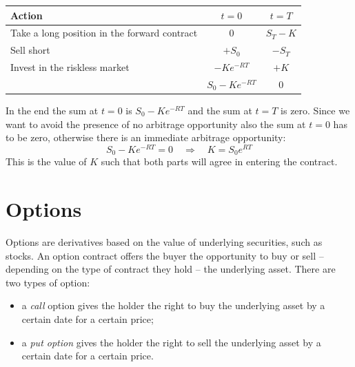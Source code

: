 \begin{center}
    \begin{tabular}{lcc}\toprule
        Action & $t=0$ & $t=T$ \\\midrule
        Take a long position in the forward contract &  0 & $S_T-K$ \\
        Sell short & $+S_0$ & $-S_T$ \\
        Invest in the riskless market & $-Ke^{-RT}$ & $+K$ \\ \midrule\midrule
         & $S_0-Ke^{-RT}$ & $0$ \\\bottomrule
    \end{tabular}
\end{center}
In the end the sum at $t=0$ is $S_0-Ke^{-RT}$ and the sum at $t=T$ is zero. Since we want to avoid the presence of no arbitrage opportunity also the sum at $t=0$ has to be zero, otherwise there is an immediate arbitrage opportunity:
\begin{equation}
    S_0-Ke^{-RT} = 0 \quad\Rightarrow\quad K = S_0e^{RT}
\end{equation}
This is the value of $K$ such that both parts will agree in entering the contract.

\section{Options}
Options are derivatives based on the value of underlying securities, such as stocks. An option contract offers the buyer the opportunity to buy or sell -- depending on the type of contract they hold -- the underlying asset. There are two types of option:
\begin{itemize}
    \item a \emph{call} option gives the holder the right to buy the underlying asset by a certain date for a certain price;
    \item a \emph{put option} gives the holder the right to sell the underlying asset by a certain date for a certain price.
\end{itemize}

